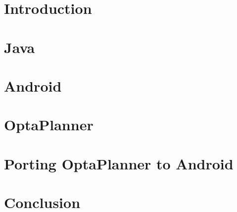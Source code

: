 \chapter{Introduction}\label{IntroductionChapter}


\chapter{Java}\label{JavaChapter}


\chapter{Android}\label{AndroidChapter}


\chapter{OptaPlanner}\label{OptaPlannerChapter}


\chapter{Porting OptaPlanner to Android}\label{PortingChapter}


\chapter{Conclusion}\label{ConclusionChapter}


